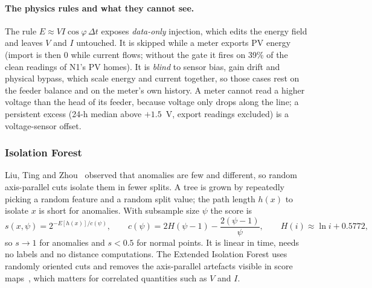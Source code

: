 \paragraph{The physics rules and what they cannot see.} The rule $E\approx V I\cos\varphi\,\Delta t$ exposes
\emph{data-only} injection, which edits the energy field and leaves $V$ and $I$ untouched. It is skipped while
a meter exports PV energy (import is then 0 while current flows; without the gate it fires on 39\% of the clean
readings of N1's PV homes). It is \emph{blind} to sensor bias, gain drift and physical bypass, which scale
energy and current together, so those cases rest on the feeder balance and on the meter's own history.
A meter cannot read a higher voltage than the head of its feeder, because voltage only drops along the line;
a persistent excess (24-h median above $+1.5$~V, export readings excluded) is a voltage-sensor offset.

\subsubsection{Isolation Forest}
Liu, Ting and Zhou~\cite{iforest} observed that anomalies are few and different, so random axis-parallel
cuts isolate them in fewer splits. A tree is grown by repeatedly picking a random feature and a random split
value; the path length $h(x)$ to isolate $x$ is short for anomalies. With subsample size $\psi$ the score is
\begin{equation}
  s(x,\psi)=2^{-E[h(x)]/c(\psi)},\qquad c(\psi)=2H(\psi-1)-\frac{2(\psi-1)}{\psi},\qquad H(i)\approx\ln i+0.5772,
\end{equation}
so $s\to1$ for anomalies and $s<0.5$ for normal points. It is linear in time, needs no labels and no distance
computations. The Extended Isolation Forest uses randomly oriented cuts and removes the axis-parallel
artefacts visible in score maps~\cite{eif}, which matters for correlated quantities such as $V$ and $I$.

